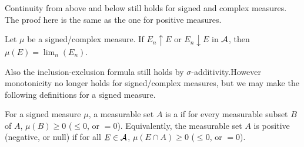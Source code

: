 Continuity from above and below still holds for signed and complex measures. The proof here is the same as the one for positive measures.
\begin{xca}
    Let $\mu$ be a signed/complex measure. If $E_n \uparrow E$ or $E_n \downarrow E$ in $\mathcal{A}$, then $\mu(E) = \lim_n(E_n)$.
\end{xca}
Also the inclusion-exclusion formula still holds by $\sigma$-additivity.However monotonicity no longer holds for signed/complex measures, but we may make the following definitions for a signed measure.

\begin{defn}
    For a signed measure $\mu$, a measurable set $A$ is a  if for every measurable subset $B$ of $A$, $\mu(B)\geq0$ ($\leq 0$, or $=0$). Equivalently, the measurable set $A$ is positive (negative, or null) if for all $E\in \mathcal{A}$, $\mu(E\cap A) \geq 0$ ($\leq 0$, or $= 0$).
\end{defn}


